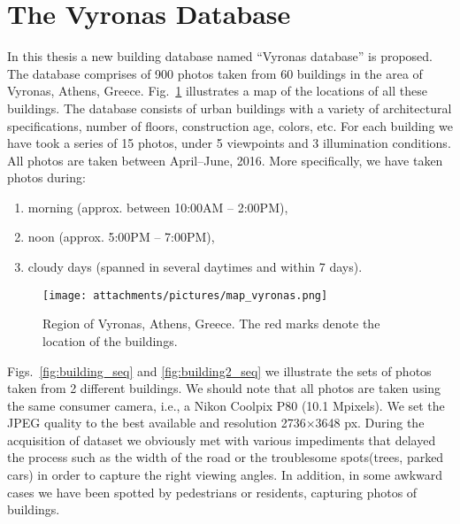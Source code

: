 \section{The Vyronas Database}\label{vyronas_db}
In this thesis a new building database named ``Vyronas database'' is proposed.
The database comprises of 900 photos taken from 60 buildings in the area of Vyronas, Athens, Greece.
Fig.~\ref{fig:map_vyronas} illustrates a map of the locations of all these buildings. 
The database consists of urban buildings with a variety of architectural  specifications, number of floors, construction age, colors, etc.
For each building we have took a series of 15 photos, under 5 viewpoints and 3 illumination conditions. 
All photos are taken between April--June, 2016. More specifically, we have taken photos during:
\newpage
\begin{enumerate}
    \item morning (approx. between 10:00AM -- 2:00PM),
    \item noon (approx. 5:00PM -- 7:00PM),
    \item cloudy days (spanned in several daytimes and within 7 days).  
\end{enumerate}

\begin{figure}[ht!]
  \centering
  \texttt{[image: attachments/pictures/map\_vyronas.png]}
  \caption{Region of Vyronas, Athens, Greece. The red marks denote the location of the buildings.}
  \label{fig:map_vyronas}
\end{figure} 


Figs.~\ref{fig:building_seq} and \ref{fig:building2_seq} we illustrate the sets of photos taken from 2 different buildings. 
We should note that all photos are taken using the same consumer camera, i.e., a Nikon Coolpix P80 (10.1 Mpixels).
We set the JPEG quality to the best available and resolution 2736$\times$3648 px. During the acquisition of dataset we obviously met with various impediments that delayed the process such as the width of the road or the troublesome spots(trees, parked cars) in order to capture the right viewing angles. In addition, in some awkward cases we have been spotted by pedestrians or residents, capturing photos of buildings.


